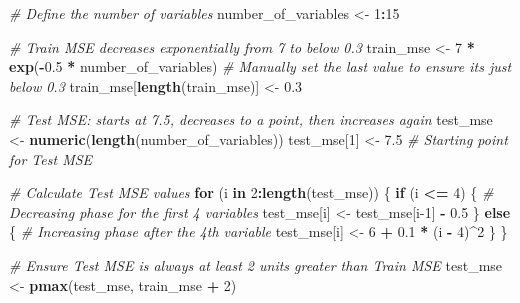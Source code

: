 \documentclass[
]{article}
\newenvironment{Shaded}{\begin{snugshade}}{\end{snugshade}}
\newcommand{\CommentTok}[1]{\textcolor[rgb]{0.56,0.35,0.01}{\textit{#1}}}
\newcommand{\ControlFlowTok}[1]{\textcolor[rgb]{0.13,0.29,0.53}{\textbf{#1}}}
\newcommand{\DecValTok}[1]{\textcolor[rgb]{0.00,0.00,0.81}{#1}}
\newcommand{\FloatTok}[1]{\textcolor[rgb]{0.00,0.00,0.81}{#1}}
\newcommand{\FunctionTok}[1]{\textcolor[rgb]{0.13,0.29,0.53}{\textbf{#1}}}
\newcommand{\NormalTok}[1]{#1}
\newcommand{\OtherTok}[1]{\textcolor[rgb]{0.56,0.35,0.01}{#1}}
\newcommand{\SpecialCharTok}[1]{\textcolor[rgb]{0.81,0.36,0.00}{\textbf{#1}}}
\begin{document}
\begin{Shaded}
\begin{Highlighting}[]
\CommentTok{\# Define the number of variables}
\NormalTok{number\_of\_variables }\OtherTok{\textless{}{-}} \DecValTok{1}\SpecialCharTok{:}\DecValTok{15}

\CommentTok{\# Train MSE decreases exponentially from 7 to below 0.3}
\NormalTok{train\_mse }\OtherTok{\textless{}{-}} \DecValTok{7} \SpecialCharTok{*} \FunctionTok{exp}\NormalTok{(}\SpecialCharTok{{-}}\FloatTok{0.5} \SpecialCharTok{*}\NormalTok{ number\_of\_variables)}
\CommentTok{\# Manually set the last value to ensure it\textquotesingle{}s just below 0.3}
\NormalTok{train\_mse[}\FunctionTok{length}\NormalTok{(train\_mse)] }\OtherTok{\textless{}{-}} \FloatTok{0.3}

\CommentTok{\# Test MSE: starts at 7.5, decreases to a point, then increases again}
\NormalTok{test\_mse }\OtherTok{\textless{}{-}} \FunctionTok{numeric}\NormalTok{(}\FunctionTok{length}\NormalTok{(number\_of\_variables))}
\NormalTok{test\_mse[}\DecValTok{1}\NormalTok{] }\OtherTok{\textless{}{-}} \FloatTok{7.5} \CommentTok{\# Starting point for Test MSE}

\CommentTok{\# Calculate Test MSE values}
\ControlFlowTok{for}\NormalTok{ (i }\ControlFlowTok{in} \DecValTok{2}\SpecialCharTok{:}\FunctionTok{length}\NormalTok{(test\_mse)) \{}
  \ControlFlowTok{if}\NormalTok{ (i }\SpecialCharTok{\textless{}=} \DecValTok{4}\NormalTok{) \{}
    \CommentTok{\# Decreasing phase for the first 4 variables}
\NormalTok{    test\_mse[i] }\OtherTok{\textless{}{-}}\NormalTok{ test\_mse[i}\DecValTok{{-}1}\NormalTok{] }\SpecialCharTok{{-}} \FloatTok{0.5}
\NormalTok{  \} }\ControlFlowTok{else}\NormalTok{ \{}
    \CommentTok{\# Increasing phase after the 4th variable}
\NormalTok{    test\_mse[i] }\OtherTok{\textless{}{-}} \DecValTok{6} \SpecialCharTok{+} \FloatTok{0.1} \SpecialCharTok{*}\NormalTok{ (i }\SpecialCharTok{{-}} \DecValTok{4}\NormalTok{)}\SpecialCharTok{\^{}}\DecValTok{2}
\NormalTok{  \}}
\NormalTok{\}}

\CommentTok{\# Ensure Test MSE is always at least 2 units greater than Train MSE}
\NormalTok{test\_mse }\OtherTok{\textless{}{-}} \FunctionTok{pmax}\NormalTok{(test\_mse, train\_mse }\SpecialCharTok{+} \DecValTok{2}\NormalTok{)}


\end{Highlighting}
\end{Shaded}
\end{document}
